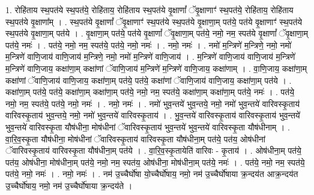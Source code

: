 \documentclass[17pt]{extarticle}
\begin{document}
1. रोहि॑ताय स्थ॒पत॑ये स्थ॒पत॑ये॒ रोहि॑ताय॒ रोहि॑ताय स्थ॒पत॑ये वृ॒क्षाणां᳚ ॅवृ॒क्षाणाꣳ॑ स्थ॒पत॑ये॒ रोहि॑ताय॒ रोहि॑ताय स्थ॒पत॑ये वृ॒क्षाणा᳚म् । . स्थ॒पत॑ये वृ॒क्षाणां᳚ ॅवृ॒क्षाणाꣳ॑ स्थ॒पत॑ये स्थ॒पत॑ये वृ॒क्षाणा॒म् पत॑ये॒ पत॑ये वृ॒क्षाणाꣳ॑ स्थ॒पत॑ये स्थ॒पत॑ये वृ॒क्षाणा॒म् पत॑ये । . वृ॒क्षाणा॒म् पत॑ये॒ पत॑ये वृ॒क्षाणां᳚ ॅवृ॒क्षाणा॒म् पत॑ये॒ नमो॒ नम॒ स्पत॑ये वृ॒क्षाणां᳚ ॅवृ॒क्षाणा॒म् पत॑ये॒ नमः॑ । . पत॑ये॒ नमो॒ नम॒ स्पत॑ये॒ पत॑ये॒ नमो॒ नमः॑ । . नमो॒ नमः॑ । . नमो॑ म॒न्त्रिणे॑ म॒न्त्रिणे॒ नमो॒ नमो॑ म॒न्त्रिणे॑ वाणि॒जाय॑ वाणि॒जाय॑ म॒न्त्रिणे॒ नमो॒ नमो॑ म॒न्त्रिणे॑ वाणि॒जाय॑ । . म॒न्त्रिणे॑ वाणि॒जाय॑ वाणि॒जाय॑ म॒न्त्रिणे॑ म॒न्त्रिणे॑ वाणि॒जाय॒ कक्षा॑णा॒म् कक्षा॑णां ॅवाणि॒जाय॑ म॒न्त्रिणे॑ म॒न्त्रिणे॑ वाणि॒जाय॒ कक्षा॑णाम् । . वा॒णि॒जाय॒ कक्षा॑णा॒म् कक्षा॑णां ॅवाणि॒जाय॑ वाणि॒जाय॒ कक्षा॑णा॒म् पत॑ये॒ पत॑ये॒ कक्षा॑णां ॅवाणि॒जाय॑ वाणि॒जाय॒ कक्षा॑णा॒म् पत॑ये । . कक्षा॑णा॒म् पत॑ये॒ पत॑ये॒ कक्षा॑णा॒म् कक्षा॑णा॒म् पत॑ये॒ नमो॒ नम॒ स्पत॑ये॒ कक्षा॑णा॒म् कक्षा॑णा॒म् पत॑ये॒ नमः॑ । . पत॑ये॒ नमो॒ नम॒ स्पत॑ये॒ पत॑ये॒ नमो॒ नमः॑ । . नमो॒ नमः॑ । . नमो॑ भुव॒न्तये॑ भुव॒न्तये॒ नमो॒ नमो॑ भुव॒न्तये॑ वारिवस्कृ॒ताय॑ वारिवस्कृ॒ताय॑ भुव॒न्तये॒ नमो॒ नमो॑ भुव॒न्तये॑ वारिवस्कृ॒ताय॑ । . भु॒व॒न्तये॑ वारिवस्कृ॒ताय॑ वारिवस्कृ॒ताय॑ भुव॒न्तये॑ भुव॒न्तये॑ वारिवस्कृ॒ता यौष॑धीना॒ मोष॑धीनां ॅवारिवस्कृ॒ताय॑ भुव॒न्तये॑ भुव॒न्तये॑ वारिवस्कृ॒ता यौष॑धीनाम् । . वा॒रि॒व॒स्कृ॒ता यौष॑धीना॒ मोष॑धीनां ॅवारिवस्कृ॒ताय॑ वारिवस्कृ॒ता यौष॑धीना॒म् पत॑ये॒ पत॑य॒ ओष॑धीनां ॅवारिवस्कृ॒ताय॑ वारिवस्कृ॒ता यौष॑धीना॒म् पत॑ये । . वा॒रि॒व॒स्कृ॒तायेति॑ वारिवः - कृ॒ताय॑ । . ओष॑धीना॒म् पत॑ये॒ पत॑य॒ ओष॑धीना॒ मोष॑धीना॒म् पत॑ये॒ नमो॒ नम॒ स्पत॑य॒ ओष॑धीना॒ मोष॑धीना॒म् पत॑ये॒ नमः॑ । . पत॑ये॒ नमो॒ नम॒ स्पत॑ये॒ पत॑ये॒ नमो॒ नमः॑ । . नमो॒ नमः॑ । . नम॑ उ॒च्चैर्घो॑षा यो॒च्चैर्घो॑षाय॒ नमो॒ नम॑ उ॒च्चैर्घो॑षाया क्र॒न्दय॑त आक्र॒न्दय॑त उ॒च्चैर्घो॑षाय॒ नमो॒ नम॑ उ॒च्चैर्घो॑षाया क्र॒न्दय॑ते । \newline
\end{document}
